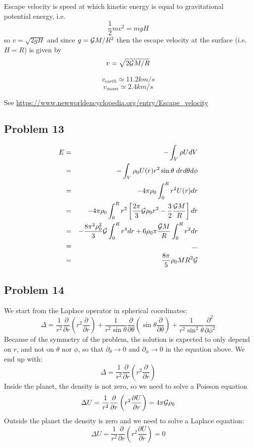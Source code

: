 Escape velocity is speed at which kinetic energy is equal to gravitational 
potential energy, i.e. 
\[
\frac{1}{2}m v^2 = m g H
\]
so $v=\sqrt{2gH}$ and since $g={\cal G}M/R^2$
then the escape velocity at the surface (i.e. $H=R$) is given by
\[
v = \sqrt{2 {\cal G} M/ R}
\]

\[
v_{earth} \simeq 11.2 km/s
\]
\[
v_{moon} \simeq 2.4 km/s
\]

See \url{https://www.newworldencyclopedia.org/entry/Escape_velocity}

\subsection{Problem 13}

\begin{eqnarray}
E 
&=& - \int_V \rho U dV \nonumber\\
&=& - \int_V \rho_0  U(r) r^2 \sin\theta \; dr d\theta d\phi \nonumber\\
&=& - 4 \pi \rho_0 \int_0^R r^2 U(r) dr \nonumber\\
&=& - 4\pi\rho_0 \int_0^R r^2 \left[ \frac{2\pi}{3}{\cal G} \rho_0 r^2 - \frac{3}{2} \frac{{\cal G} M}{R}  \right] dr \nonumber\\
&=& - \frac{8\pi^2\rho_0^2}{3} {\cal G} \int_0^R r^4 dr  
+ 6 \rho_0 \pi  \frac{{\cal G} M}{R} \int_0^R r^2  dr \nonumber\\
&=& ... \nonumber\\
&=& \frac{8 \pi}{5} \rho_0 M R^2 {\cal G}
\end{eqnarray}

\subsection{Problem 14}

We start from the Laplace operator in spherical coordinates:
\[
\Delta = \frac{1}{r^2} \frac{\partial }{\partial r}\left( r^2 \frac{\partial }{\partial r}\right)
+\frac{1}{r^2 \sin\theta} \frac{\partial }{\partial \theta}
\left(
\sin\theta \frac{\partial }{\partial\theta}
\right)
+ \frac{1}{r^2 \sin^2\theta} \frac{\partial^2 }{\partial\phi^2}
\]
Because of the symmetry of the problem, the solution is expected to only depend on $r$, and not on $\theta$
nor $\phi$, so that $\partial_\theta \rightarrow 0$ and $\partial_\phi \rightarrow 0$ in the equation above. 
We end up with:
\[
\Delta = \frac{1}{r^2} \frac{\partial }{\partial r}\left( r^2 \frac{\partial }{\partial r}\right)
\]
Inside the planet, the density is not zero, so we need to solve a Poisson equation
\[
\Delta U = \frac{1}{r^2} \frac{\partial }{\partial r}\left( r^2 \frac{\partial U}{\partial r}\right)
= 4 \pi {\cal G} \rho_0  
\]
Outside the planet the density is zero and we need to solve a Laplace equation:
\[
\Delta U = \frac{1}{r^2} \frac{\partial }{\partial r}\left( r^2 \frac{\partial U}{\partial r}\right)
= 0 
\]

